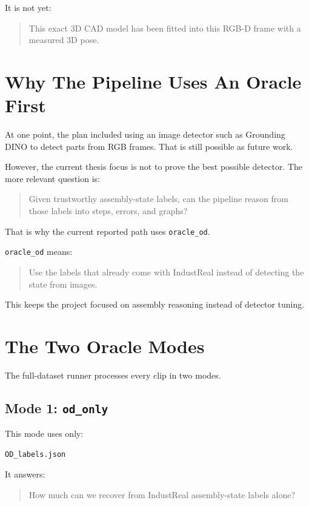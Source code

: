 \documentclass[11pt,a4paper]{article}
\begin{document}
It is not yet:

\begin{quote}
This exact 3D CAD model has been fitted into this RGB-D frame with a measured 3D pose.
\end{quote}

\section{Why The Pipeline Uses An Oracle First}

At one point, the plan included using an image detector such as Grounding DINO to detect parts from RGB frames. That is still possible as future work.

However, the current thesis focus is not to prove the best possible detector. The more relevant question is:

\begin{quote}
Given trustworthy assembly-state labels, can the pipeline reason from those labels into steps, errors, and graphs?
\end{quote}

That is why the current reported path uses \texttt{oracle\_od}.

\texttt{oracle\_od} means:

\begin{quote}
Use the labels that already come with IndustReal instead of detecting the state from images.
\end{quote}

This keeps the project focused on assembly reasoning instead of detector tuning.

\section{The Two Oracle Modes}

The full-dataset runner processes every clip in two modes.

\subsection{Mode 1: \texttt{od\_only}}

This mode uses only:

\begin{lstlisting}
OD_labels.json
\end{lstlisting}

It answers:

\begin{quote}
How much can we recover from IndustReal assembly-state labels alone?
\end{quote}
\end{document}
